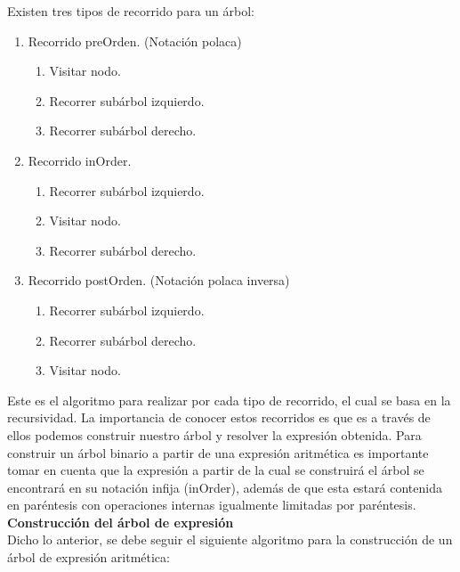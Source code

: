 \documentclass{article}
\begin{document}
Existen tres tipos de recorrido para un árbol:\\
\begin{enumerate}
\item Recorrido preOrden. (Notación polaca)
\begin{enumerate}
\item Visitar nodo.
\item Recorrer subárbol izquierdo.
\item Recorrer subárbol derecho.
\end{enumerate}
\item Recorrido inOrder.
\begin{enumerate}
\item Recorrer subárbol izquierdo.
\item Visitar nodo.
\item Recorrer subárbol derecho.
\end{enumerate}
\item Recorrido postOrden. (Notación polaca inversa)
\begin{enumerate}
\item Recorrer subárbol izquierdo.
\item Recorrer subárbol derecho.
\item Visitar nodo.
\end{enumerate}
\end{enumerate}
Este es el algoritmo para realizar por cada tipo de recorrido, el cual se basa en la recursividad.
La importancia de conocer estos recorridos es que es a través de ellos podemos construir nuestro árbol y resolver la expresión obtenida.
Para construir un árbol binario a partir de una expresión aritmética es importante tomar en cuenta que la expresión a partir de la cual se construirá el árbol se encontrará en su notación infija (inOrder), además de que esta estará contenida en paréntesis con operaciones internas igualmente limitadas por paréntesis.\\


\textbf{Construcción del árbol de expresión}\\

Dicho lo anterior, se debe seguir el siguiente algoritmo para la construcción de un árbol de expresión aritmética:\\
\end{document}
